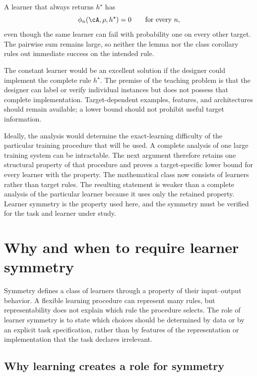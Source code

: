 \documentclass[11pt,twoside]{article}
\theoremstyle{definition}
\theoremstyle{remark}
\begin{document}
A learner that always returns \(h^\star\) has
\begin{equation}
 \phi_n(\cA,\rho,h^\star)=0
 \qquad\text{for every }n,
 \label{eq:hard-coded-target}
\end{equation}
even though the same learner can fail with probability one on every other
target. The pairwise sum remains large, so neither the lemma nor the class
corollary rules out immediate success on the intended rule.

The constant learner would be an excellent solution if the designer could
implement the complete rule \(h^\star\). The premise of the teaching problem is
that the designer can label or verify individual instances but does not possess
that complete implementation. Target-dependent examples, features, and
architectures should remain available; a lower bound should not prohibit useful
target information.

Ideally, the analysis would determine the exact-learning difficulty of the
particular training procedure that will be used. A complete analysis of one
large training system can be intractable. The next argument therefore retains
one structural property of that procedure and proves a target-specific lower
bound for every learner with the property. The mathematical class now consists
of learners rather than target rules. The resulting statement is weaker than a
complete analysis of the particular learner because it uses only the retained
property. Learner symmetry is the property used here, and the symmetry must be
verified for the task and learner under study.

\section{Why and when to require learner symmetry}
\label{sec:symmetry}

Symmetry defines a class of learners through a property of their input--output
behavior. A flexible learning procedure can represent many rules, but
representability does not explain which rule the procedure selects. The role of
learner symmetry is to state which choices should be determined by data or by
an explicit task specification, rather than by features of the representation
or implementation that the task declares irrelevant.

\subsection{Why learning creates a role for symmetry}
\label{sec:why-symmetry}
\end{document}
